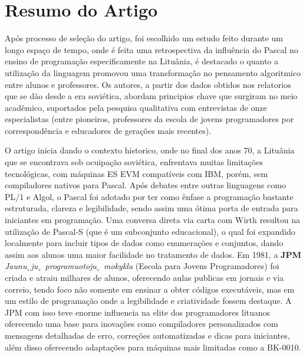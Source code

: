\documentclass[12pt,a4paper,oneside]{abntex2}
\begin{document}
\imprimircapa  %

\imprimirfolhaderosto  %

\tableofcontents*
\newpage  %

\textual
\chapter{Resumo do Artigo}
Após processo de seleção do artigo, foi escolhido um estudo feito durante um longo espaço de tempo, onde é feita uma retrospectiva da influência do Pascal no ensino de programação especificamente na Lituânia, é destacado o quanto a utilização da linguagem promovou uma transformação no pensamento algoritmico entre alunos e professores. Os autores, a partir dos dados obtidos nos relatorios que se dão desde a era soviética, abordam principios chave que surgiram no meio acadêmico, suportados pela pesquisa qualitativa com entrevistas de onze especialistas (entre pioneiros, professores da escola de jovens programadores por correspondência e educadores de gerações mais recentes).

O artigo inicia dando o contexto historico, onde no final dos anos 70, a Lituânia que se encontrava sob ocuipação soviética, enfrentava muitas limitações tecnológicas, com máquinas ES EVM compatíveis com IBM, porém, sem compiladores nativos para Pascal. Após debates entre outras linguagens como PL/1 e Algol, o Pascal foi adotado por ter como ênfase a programação bastante estruturada, clareza e legibilidade, sendo assim uma ótima porta de entrada para iniciantes em programação. Uma conversa direta via carta com Wirth resultou na utilização de Pascal-S (que é um subconjunto educacional), o qual foi expandido localmente para incluir tipos de dados como enumerações e conjuntos, dando assim aos alunos uma maior facilidade no tratamento de dados. Em 1981, a \textbf{JPM} \textit{Jaunu˛ju˛ programuotoju˛ mokykla} (Escola para Jovens Programadores) foi criada e atraiu milhares de alunos, oferecendo aulas publicas em jornais e via correio, tendo foco não somente em ensinar a obter códigos executáveis, mas em um estilo de programação onde a legibilidade e criatividade fossem destaque. A JPM com isso teve enorme influencia na elite dos programadores lituanos oferecendo uma base para inovações como compiladores personalizados com mensagens detalhadas de erro, correções automatizadas e dicas para iniciantes, além disso oferecendo adaptações para máquinas mais limitadas como a BK-0010.
\end{document}
